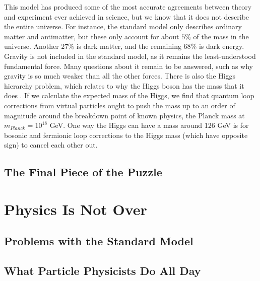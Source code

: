 This model has produced some of the most accurate agreements between theory and experiment ever achieved in science, but we know that it does not describe the entire universe. For instance, the standard model only describes ordinary matter and antimatter, but these only account for about $5\%$ of the mass in the universe. Another $27\%$ is dark matter, and the remaining $68\%$ is dark energy. Gravity is not included in the standard model, as it remains the least-understood fundamental force. Many questions about it remain to be answered, such as why gravity is so much weaker than all the other forces. There is also the Higgs hierarchy problem, which relates to why the Higgs boson has the mass that it does \cite{hierarchy}. If we calculate the expected mass of the Higgs, we find that quantum loop corrections from virtual particles ought to push the mass up to an order of magnitude around the breakdown point of known physics, the Planck mass at $m_{Planck} = 10^{18}$ GeV. One way the Higgs can have a mass around 126 GeV is for bosonic and fermionic loop corrections to the Higgs mass (which have opposite sign) to cancel each other out.

\subsection{The Final Piece of the Puzzle}

\section{Physics Is Not Over}

\subsection{Problems with the Standard Model}

\subsection{What Particle Physicists Do All Day}